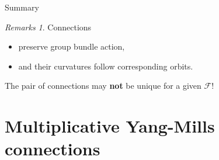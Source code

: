 \documentclass[hyperref={pdfpagelabels=false}]{beamer}
\theoremstyle{plain}
\theoremstyle{remark}
\newtheorem*{remark}{Remarks}
\begin{document}
{\begin{frame}{Summary}
\begin{remark}
Connections 
\begin{itemize}
	\item preserve group bundle action, 
	\item and their curvatures follow corresponding orbits.
\end{itemize}
The pair of connections may \textbf{not} be unique for a given $\mathcal{F}$!
\end{remark}
\end{frame}
}

\section{Multiplicative Yang-Mills connections}
\end{document}
